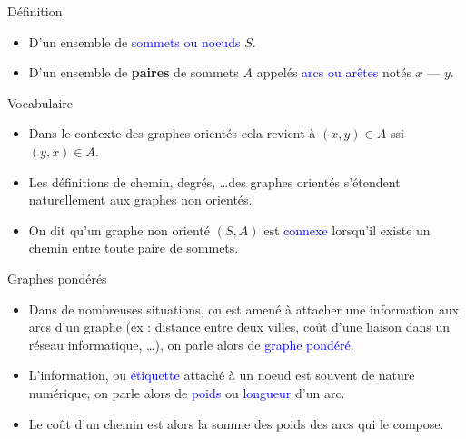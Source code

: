 \documentclass[10pt]{beamer}
\begin{document}
\begin{frame}[fragile]{\Ctitle}{\stitle}
	\begin{alertblock}{Définition}
		\onslide<1->{Un \textcolor{red}{graphe non orienté} est la donnée :}
		\begin{itemize}
			\item<2->{D'un ensemble de \textcolor{blue}{sommets ou noeuds} $S$.}
			\item<3->{D'un ensemble de \textbf{paires} de sommets $A$  appelés \textcolor{blue}{arcs ou arêtes} notés $x \text{ --- } y$.}
		\end{itemize}
	\end{alertblock}
	\begin{block}{Vocabulaire}
		\begin{itemize}
			\item<4-> Dans le contexte des graphes orientés cela revient à $(x,y) \in A$ ssi $(y,x) \in A$.
			\item<5-> Les définitions de chemin, degrés, \dots des graphes orientés s'étendent naturellement aux graphes non orientés.
			\item<6-> On dit qu'un graphe non orienté $(S,A)$ est \textcolor{blue}{connexe} lorsqu'il existe un chemin entre toute paire de sommets.
		\end{itemize}
	\end{block}
\end{frame}

\begin{frame}[fragile]{\Ctitle}{\stitle}
	\begin{block}{Graphes pondérés}
		\begin{itemize}
			\item<1-> Dans de nombreuses situations, on est amené à attacher une information aux arcs d'un graphe (ex : distance entre deux villes, coût d'une liaison dans un réseau informatique, \dots), on parle alors de \textcolor{blue}{graphe pondéré}.
			\item<2-> L'information, ou \textcolor{blue}{étiquette} attaché à un noeud est souvent de nature numérique, on parle alors de \textcolor{blue}{poids} ou \textcolor{blue}{longueur} d'un arc.
				\item<3->Le coût d'un chemin est alors la somme des poids des arcs qui le compose.
		\end{itemize}
	\end{block}
\end{frame}
\end{document}
